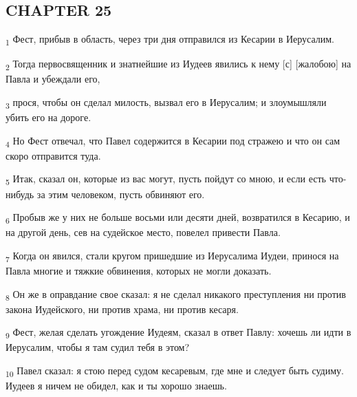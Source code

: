 \subsection{CHAPTER 25}
\begin{tcolorbox}
\textsubscript{1} Фест, прибыв в область, через три дня отправился из Кесарии в Иерусалим.
\end{tcolorbox}
\begin{tcolorbox}
\textsubscript{2} Тогда первосвященник и знатнейшие из Иудеев явились к нему [с] [жалобою] на Павла и убеждали его,
\end{tcolorbox}
\begin{tcolorbox}
\textsubscript{3} прося, чтобы он сделал милость, вызвал его в Иерусалим; и злоумышляли убить его на дороге.
\end{tcolorbox}
\begin{tcolorbox}
\textsubscript{4} Но Фест отвечал, что Павел содержится в Кесарии под стражею и что он сам скоро отправится туда.
\end{tcolorbox}
\begin{tcolorbox}
\textsubscript{5} Итак, сказал он, которые из вас могут, пусть пойдут со мною, и если есть что-нибудь за этим человеком, пусть обвиняют его.
\end{tcolorbox}
\begin{tcolorbox}
\textsubscript{6} Пробыв же у них не больше восьми или десяти дней, возвратился в Кесарию, и на другой день, сев на судейское место, повелел привести Павла.
\end{tcolorbox}
\begin{tcolorbox}
\textsubscript{7} Когда он явился, стали кругом пришедшие из Иерусалима Иудеи, принося на Павла многие и тяжкие обвинения, которых не могли доказать.
\end{tcolorbox}
\begin{tcolorbox}
\textsubscript{8} Он же в оправдание свое сказал: я не сделал никакого преступления ни против закона Иудейского, ни против храма, ни против кесаря.
\end{tcolorbox}
\begin{tcolorbox}
\textsubscript{9} Фест, желая сделать угождение Иудеям, сказал в ответ Павлу: хочешь ли идти в Иерусалим, чтобы я там судил тебя в этом?
\end{tcolorbox}
\begin{tcolorbox}
\textsubscript{10} Павел сказал: я стою перед судом кесаревым, где мне и следует быть судиму. Иудеев я ничем не обидел, как и ты хорошо знаешь.
\end{tcolorbox}
